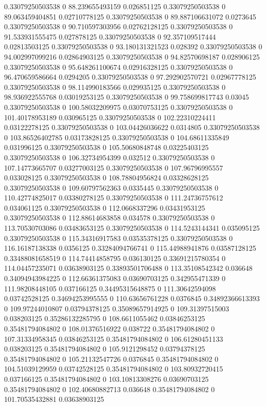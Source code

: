 0.33079250503538 0 88.239655493159 0.026851125
0.33079250503538 0 89.063459404851 0.02710778125
0.33079250503538 0 89.887106631072 0.0273645
0.33079250503538 0 90.710597303956 0.02762128125
0.33079250503538 0 91.533931555475 0.027878125
0.33079250503538 0 92.357109517444 0.02813503125
0.33079250503538 0 93.180131321523 0.028392
0.33079250503538 0 94.002997099216 0.02864903125
0.33079250503538 0 94.82570698187 0.028906125
0.33079250503538 0 95.648261100674 0.02916328125
0.33079250503538 0 96.470659586664 0.0294205
0.33079250503538 0 97.292902570721 0.02967778125
0.33079250503538 0 98.114990183566 0.029935125
0.33079250503538 0 98.936922555768 0.03019253125
0.33079250503538 0 99.758699817743 0.03045
0.33079250503538 0 100.58032209975 0.03070753125
0.33079250503538 0 101.40178953189 0.030965125
0.33079250503538 0 102.22310224411 0.03122278125
0.33079250503538 0 103.04426036622 0.0314805
0.33079250503538 0 103.86526402785 0.03173828125
0.33079250503538 0 104.68611335849 0.031996125
0.33079250503538 0 105.50680848748 0.03225403125
0.33079250503538 0 106.32734954399 0.032512
0.33079250503538 0 107.14773665707 0.03277003125
0.33079250503538 0 107.96796995557 0.033028125
0.33079250503538 0 108.78804956824 0.03328628125
0.33079250503538 0 109.60797562363 0.0335445
0.33079250503538 0 110.42774825017 0.03380278125
0.33079250503538 0 111.24736757612 0.034061125
0.33079250503538 0 112.0668337296 0.03431953125
0.33079250503538 0 112.88614683858 0.034578
0.33079250503538 0 113.70530703086 0.03483653125
0.33079250503538 0 114.5243144341 0.035095125
0.33079250503538 0 115.34316917583 0.03535378125
0.33079250503538 0 116.16187138338 0.0356125
0.33284094766741 0 115.44988941876 0.03587128125
0.33488081658519 0 114.74414858795 0.036130125
0.33691215780354 0 114.04457235071 0.03638903125
0.33893501706488 0 113.35108542342 0.036648
0.34094943984225 0 112.66361375083 0.03690703125
0.342955471339 0 111.98208448105 0.037166125
0.34495315648875 0 111.30642594098 0.03742528125
0.34694253995555 0 110.63656761228 0.0376845
0.34892366613393 0 109.97244010807 0.03794378125
0.35089657914925 0 109.31397515003 0.038203125
0.35286132285795 0 108.6611055462 0.03846253125
0.35481794084802 0 108.01376516922 0.038722
0.35481794084802 0 107.31334958345 0.03846253125
0.35481794084802 0 106.61280451133 0.038203125
0.35481794084802 0 105.9121298452 0.03794378125
0.35481794084802 0 105.21132547726 0.0376845
0.35481794084802 0 104.51039129959 0.03742528125
0.35481794084802 0 103.80932720415 0.037166125
0.35481794084802 0 103.10813308276 0.03690703125
0.35481794084802 0 102.40680882713 0.036648
0.35481794084802 0 101.70535432881 0.03638903125
